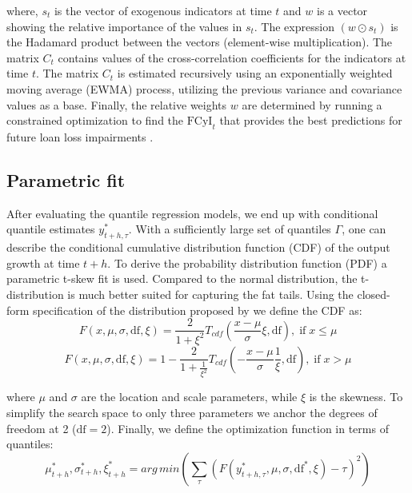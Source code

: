 \documentclass[12pt,a4paper]{article}
\begin{document}
where, $s_t$ is the vector of exogenous indicators at time $t$ and $w$ is a vector showing the relative importance of the values in $s_t$. The expression $(w\odot s_t)$ is the Hadamard product between the vectors (element-wise multiplication). The matrix $C_t$ contains values of the cross-correlation coefficients for the indicators at time $t$. The matrix $C_t$ is estimated recursively using an exponentially weighted moving average (EWMA) process, utilizing the previous variance and covariance values as a base. Finally, the relative weights $w$ are determined by running a constrained optimization to find the $\text{FCyI}_t$ that provides the best predictions for future loan loss impairments \citep{plasil2014}.

\subsection{Parametric fit}
After evaluating the quantile regression models, we end up with conditional quantile estimates $y_{t+h, \tau}^*$. With a sufficiently large set of quantiles $\Gamma$, one can describe the conditional cumulative distribution function (CDF) of the output growth at time $t+h$. To derive the probability distribution function (PDF) a parametric t-skew fit \citep{adrian_2019} is used. Compared to the normal distribution, the t-distribution is much better suited for capturing the fat tails. Using the closed-form specification of the distribution proposed by \citet{giot2003} we define the CDF as:
\begin{equation}
    \label{eq:tskew_cdf_n}
    F(x, \mu, \sigma, \text{df}, \xi) = \frac{2}{1+\xi^2} T_{cdf}\left(\frac{x-\mu}{\sigma}\xi, \text{df}\right), \;\text{if}\; x \leq \mu 
\end{equation}
\begin{equation}
    \label{eq:tskew_cdf_p}
    F(x, \mu, \sigma, \text{df}, \xi) = 1 - \frac{2}{1+\frac{1}{\xi^2}} T_{cdf}\left(-\frac{x-\mu}{\sigma}\frac{1}{\xi}, \text{df}\right), \;\text{if}\; x > \mu 
\end{equation}

where $\mu$ and $\sigma$ are the location and scale parameters, while $\xi$ is the skewness. To simplify the search space to only three parameters we anchor the degrees of freedom at 2 ($\text{df}=2$). Finally, we define the optimization function in terms of quantiles:
\begin{equation}
    \label{eq:tskew_cdf_loss}
    \mu_{t+h}^*, \sigma_{t+h}^*, \xi_{t+h}^* = arg\,min\left(\sum_\tau \left(F(y_{t+h, \tau}^*, \mu, \sigma, \text{df}^*, \xi)-\tau\right)^2\right)
\end{equation}
\end{document}
